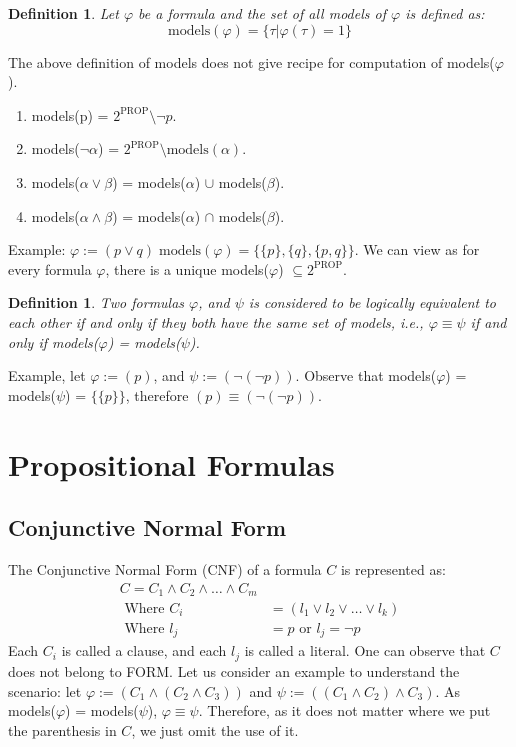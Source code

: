 \documentclass{article}
\newtheorem{definition}[theorem]{Definition}
\begin{document}
\begin{definition}
	Let $\varphi$ be a formula and the set of all models of $\varphi$ is defined as:
	$$\text{models}(\varphi) = \{\tau | \varphi(\tau) = 1 \}$$

\end{definition}

The above definition of models does not give recipe for computation of models($\varphi$).
\begin{enumerate}
	\item models(p) = $2^{\text{PROP}} \setminus {\lnot p}$.
	\item models($\lnot \alpha$) = $2^{\text{PROP}} \setminus \text{models}(\alpha)$.
	\item models($\alpha \lor \beta$) = models($\alpha$) $\cup$ models($\beta$).
	\item models($\alpha \land \beta$) = models($\alpha$) $\cap$ models($\beta$).
\end{enumerate}
Example: $\varphi := (p \lor q) \; \text{models}(\varphi) = \{ \{p\},  \{q\}, \{p,q\} \}$.
We can view as for every formula $\varphi$, there is a unique models($\varphi$) $\subseteq 2^{\text{PROP}}$.
\begin{definition}
	Two formulas $\varphi$, and $\psi$ is considered to be logically equivalent to each other if and only if they both have the same set of models, i.e., $\varphi \equiv \psi$ if and only if models($\varphi$) = models($\psi$).
\end{definition}
Example, let $\varphi := (p)$, and $\psi := (\lnot(\lnot p))$. Observe that models($\varphi$) = models($\psi$) = $\{\{p\}\}$, therefore $(p) \equiv (\lnot (\lnot p))$.


\section{Propositional Formulas}

\subsection{Conjunctive Normal Form}

The Conjunctive Normal Form (CNF) of a formula $C$ is represented as:
\begin{align*}
	C = C_1 \land C_2 \land \ldots \land C_{m} \\
	\text{ Where } C_{i} &= ( l_1 \lor l_2 \lor \ldots \lor l_k)\\
	\text{ Where } l_{j} &= p \text{ or } l_{j} = \lnot p
\end{align*}
Each $C_i$ is called a clause, and each $l_j$ is called a literal. One can observe that $C$ does not belong to FORM. Let us consider an example to understand the scenario:
let $\varphi := (C_1 \land (C_2 \land C_3))$ and $\psi := ((C_1 \land C_2) \land C_3)$. As models($\varphi$) = models($\psi$), $\varphi \equiv \psi$. Therefore, as it does not matter where we put the parenthesis in $C$, we just omit the use of it.
\end{document}
